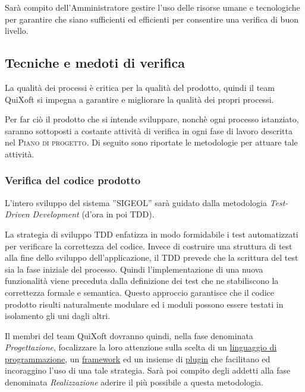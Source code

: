 \documentclass[11pt,a4paper]{article}
\begin{document}
Sarà compito dell'Amministratore gestire l'uso delle risorse umane e tecnologiche per garantire che siano sufficienti ed efficienti per consentire una verifica di buon livello.
\subsection{Tecniche e medoti di verifica}
La qualità dei processi è critica per la qualità del prodotto, quindi il team QuiXoft si impegna a garantire e migliorare la qualità dei propri processi.

Per far ciò il prodotto che si intende sviluppare, nonchè ogni processo istanziato, saranno sottoposti a costante attività di verifica in ogni fase di lavoro descritta nel \textsc{Piano di progetto}. Di seguito sono riportate le metodologie per attuare tale attività.
\subsubsection{Verifica del codice prodotto}
L'intero sviluppo del sistema ''SIGEOL'' sarà guidato dalla metodologia \textit{Test-Driven Development} (d'ora in poi TDD).

La strategia di sviluppo TDD enfatizza in modo formidabile i test automatizzati per verificare la correttezza del codice. Invece di costruire una struttura di test alla fine dello sviluppo dell’applicazione, il TDD prevede che la scrittura del test sia la fase iniziale del processo. Quindi l’implementazione di una nuova funzionalità viene preceduta dalla definizione dei test che ne stabiliscono la correttezza formale e semantica. Questo approccio garantisce che il codice prodotto risulti naturalmente modulare ed i moduli possono essere testati in isolamento gli uni dagli altri.

Il membri del team QuiXoft dovranno quindi, nella fase denominata \textit{Proget\-tazione}, focalizzare la loro attenzione sulla scelta di un \underline{linguaggio di} \underline{programmazione}, un \underline{framework} ed un insieme di \underline{plugin} che facilitano ed incoraggino l'uso di una tale strategia. Sarà poi compito degli addetti alla fase denominata \textit{Realizzazione} aderire il più possibile a questa metodologia.
\end{document}
